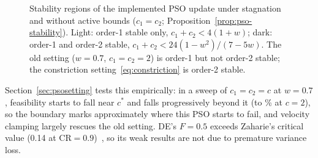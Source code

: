 \begin{figure}[!t]
\begin{minipage}[c]{0.44\textwidth}\centering
{}
\end{minipage}\hfill
\begin{minipage}[c]{0.53\textwidth}
\caption{Stability regions of the implemented PSO update under stagnation and without active bounds ($c_1=c_2$; Proposition~\ref{prop:pso-stability}). Light: order-1 stable only, $c_1+c_2<4(1+w)$; dark: order-1 and order-2 stable, $c_1+c_2<24(1-w^2)/(7-5w)$. The old setting ($w=0.7$, $c_1=c_2=2$) is order-1 but not order-2 stable; the constriction setting~\eqref{eq:constriction} is order-2 stable.}
\label{fig:S-th-stability}
\end{minipage}
\end{figure}
Section~\ref{sec:psosetting} tests this empirically: in a sweep of $c_1=c_2=c$ at $w=0.7$, feasibility starts to fall near $c^*$ and falls progressively beyond it (to \NSFeasCTwoZero\% at $c=2$), so the boundary marks approximately where this PSO starts to fail, and velocity clamping largely rescues the old setting. DE's $F=0.5$ exceeds Zaharie's critical value (0.14 at $\mathrm{CR}=0.9$)~\cite{Zaharie2002}, so its weak results are not due to premature variance loss.

